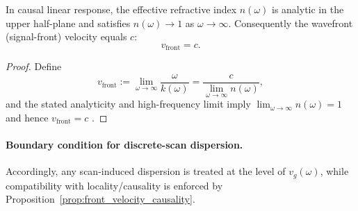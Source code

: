 \begin{proposition}\label{prop:front_velocity_causality}
In causal linear response, the effective refractive index $n(\omega)$ is analytic in the upper half-plane and satisfies $n(\omega)\to 1$ as $\omega\to\infty$. Consequently the wavefront (signal-front) velocity equals $c$:
\begin{equation}
v_{\mathrm{front}}=c.
\end{equation}
\end{proposition}
\begin{proof}
Define
\begin{equation}
v_{\mathrm{front}}:=\lim_{\omega\to\infty}\frac{\omega}{k(\omega)}=\frac{c}{\lim_{\omega\to\infty} n(\omega)},
\end{equation}
and the stated analyticity and high-frequency limit imply $\lim_{\omega\to\infty}n(\omega)=1$ and hence $v_{\mathrm{front}}=c$ \cite{Brillouin1960,Jackson1998}.
\end{proof}

\paragraph{Boundary condition for discrete-scan dispersion.}
Accordingly, any scan-induced dispersion is treated at the level of $v_g(\omega)$, while compatibility with locality/causality is enforced by Proposition~\ref{prop:front_velocity_causality}.
